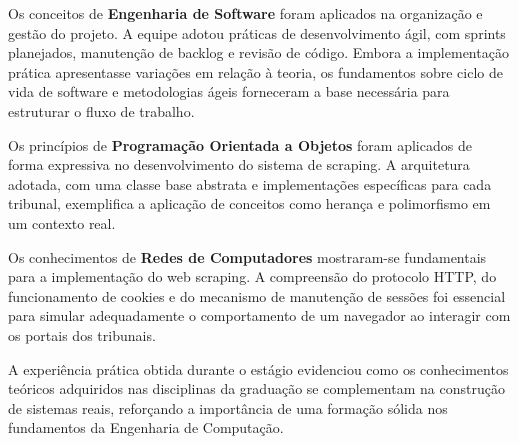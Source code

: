 \documentclass[
	12pt,
	oneside,
	a4paper,
	brazil,
	sumario=tradicional
]{abntex2}
\begin{document}
Os conceitos de \textbf{Engenharia de Software} foram aplicados na organização e gestão do projeto. A equipe adotou práticas de desenvolvimento ágil, com sprints planejados, manutenção de backlog e revisão de código. Embora a implementação prática apresentasse variações em relação à teoria, os fundamentos sobre ciclo de vida de software e metodologias ágeis forneceram a base necessária para estruturar o fluxo de trabalho.

Os princípios de \textbf{Programação Orientada a Objetos} foram aplicados de forma expressiva no desenvolvimento do sistema de scraping. A arquitetura adotada, com uma classe base abstrata e implementações específicas para cada tribunal, exemplifica a aplicação de conceitos como herança e polimorfismo em um contexto real.

Os conhecimentos de \textbf{Redes de Computadores} mostraram-se fundamentais para a implementação do web scraping. A compreensão do protocolo HTTP, do funcionamento de cookies e do mecanismo de manutenção de sessões foi essencial para simular adequadamente o comportamento de um navegador ao interagir com os portais dos tribunais.

A experiência prática obtida durante o estágio evidenciou como os conhecimentos teóricos adquiridos nas disciplinas da graduação se complementam na construção de sistemas reais, reforçando a importância de uma formação sólida nos fundamentos da Engenharia de Computação.


\end{document}
